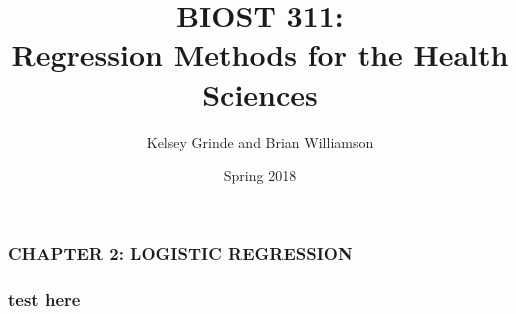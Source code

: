 \documentclass[12pt, 
hyperref={colorlinks=true, linkcolor=blue, urlcolor=cyan}]{beamer}
\title{BIOST 311: \\ Regression Methods for the Health Sciences}
\author{Kelsey Grinde and Brian Williamson}
\institute{UW Biostatistics}
\date{Spring 2018}
\begin{document}
\begin{frame}
\titlepage\thispagestyle{empty}
\end{frame}

  
\setcounter{framenumber}{\value{chap1}}

\begin{frame}
\frametitle{CHAPTER 2: LOGISTIC REGRESSION}
\end{frame}

\begin{frame}
\frametitle{test here}
\end{frame}
\end{document}
